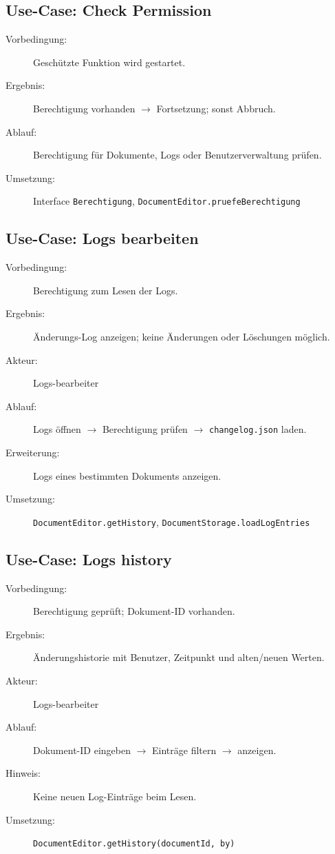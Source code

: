 \subsection{Use-Case: Check Permission}
\begin{description}
    \item[Vorbedingung:] Geschützte Funktion wird gestartet.
    \item[Ergebnis:] Berechtigung vorhanden $\rightarrow$ Fortsetzung; sonst Abbruch.
    \item[Ablauf:] Berechtigung für Dokumente, Logs oder Benutzerverwaltung prüfen.
    \item[Umsetzung:] Interface \texttt{Berechtigung}, \texttt{DocumentEditor.pruefeBerechtigung}
\end{description}

\subsection{Use-Case: Logs bearbeiten}
\begin{description}
    \item[Vorbedingung:] Berechtigung zum Lesen der Logs.
    \item[Ergebnis:] Änderungs-Log anzeigen; keine Änderungen oder Löschungen möglich.
    \item[Akteur:] Logs-bearbeiter
    \item[Ablauf:] Logs öffnen $\rightarrow$ Berechtigung prüfen $\rightarrow$ \texttt{changelog.json} laden.
    \item[Erweiterung:] Logs eines bestimmten Dokuments anzeigen.
    \item[Umsetzung:] \texttt{DocumentEditor.getHistory}, \texttt{DocumentStorage.loadLogEntries}
\end{description}

\subsection{Use-Case: Logs history}
\begin{description}
    \item[Vorbedingung:] Berechtigung geprüft; Dokument-ID vorhanden.
    \item[Ergebnis:] Änderungshistorie mit Benutzer, Zeitpunkt und alten/neuen Werten.
    \item[Akteur:] Logs-bearbeiter
    \item[Ablauf:] Dokument-ID eingeben $\rightarrow$ Einträge filtern $\rightarrow$ anzeigen.
    \item[Hinweis:] Keine neuen Log-Einträge beim Lesen.
    \item[Umsetzung:] \texttt{DocumentEditor.getHistory(documentId, by)}
\end{description}

